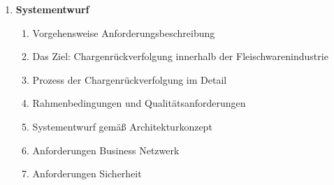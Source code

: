 \begin{small}
\begin{enumerate}
\begin{enumerate}[label*=\arabic*.]
    \end{enumerate}
    \item \textbf{Systementwurf}
    \begin{enumerate}[label*=\arabic*.]
      \item Vorgehensweise Anforderungsbeschreibung
      \item Das Ziel: Chargenrückverfolgung innerhalb der Fleischwarenindustrie
      \item Prozess der Chargenrückverfolgung im Detail
      \item Rahmenbedingungen und Qualitätsanforderungen
      \item Systementwurf gemäß Architekturkonzept
      \item Anforderungen Business Netzwerk
      \item Anforderungen Sicherheit

\end{enumerate}
\end{enumerate}
\end{small}
